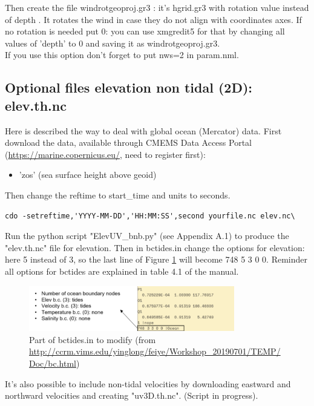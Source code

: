 \documentclass[preprints,briefreport,accept,oneauthor,pdftex]{Definitions/mdpi}
\begin{document}
Then create the file windrotgeoproj.gr3 : it's hgrid.gr3 with rotation value instead of depth . It rotates the wind in case they do not align with coordinates axes. If no rotation is needed put 0: you can use xmgredit5 for that by changing all values of 'depth' to 0 and saving it as windrotgeoproj.gr3.\\
If you use this option don't forget to put nws=2 in param.nml.

\subsection{Optional files elevation non tidal (2D): elev.th.nc}
\noindent Here is described the way to deal with global ocean (Mercator) data. First download the data, available through CMEMS Data Access Portal (\url{https://marine.copernicus.eu/}, need to register first):
\begin{itemize}
    \item 'zos' (sea surface height above geoid)
\end{itemize}
Then change the reftime  to start\_time and units to seconds.
\begin{lstlisting}
cdo -setreftime,'YYYY-MM-DD','HH:MM:SS',second yourfile.nc elev.nc\
\end{lstlisting}
Run the python script "ElevUV\_bnb.py" (see Appendix A.1) to produce the "elev.th.nc" file for elevation. Then in bctides.in change the options for elevation: here 5 instead of 3, so the last line of Figure \ref{fig:caseBC} will become 748 5 3 0 0. Reminder all options for bctides are explained in table 4.1 of the manual.\\
\begin{figure}[htbp]
    \centering
    \includegraphics[width=0.8\textwidth]{figures/elevbc.png}
    \caption{Part of bctides.in to modify (from \url{http://ccrm.vims.edu/yinglong/feiye/Workshop_20190701/TEMP/Doc/bc.html})}
    \label{fig:caseBC}
\end{figure}
It's also possible to include non-tidal velocities by downloading eastward and northward velocities and creating "uv3D.th.nc". (Script in progress).
\end{document}
